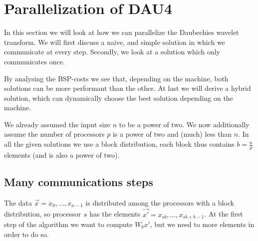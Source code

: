 
\section{Parallelization of DAU4}
\label{sec:par}

In this section we will look at how we can parallelize the Daubechies wavelet transform. We will first discuss a naive, and simple solution in which we communicate at every step. Secondly, we look at a solution which only communicates once.

By analysing the BSP-costs we see that, depending on the machine, both solutions can be more performant than the other. At last we will derive a hybrid solution, which can dynamically choose the best solution depending on the machine.

We already assumed the input size $n$ to be a power of two. We now additionally assume the number of processors $p$ is a power of two and (much) less than $n$. In all the given solutions we use a block distribution, each block thus contains $b = \frac{n}{p}$ elements (and is also a power of two).

\subsection{Many communications steps}
The data $\vec{x} = x_0, \ldots, x_{n-1}$ is distributed among the processors with a block distribution, so processor $s$ has the elements $\vec{x'} = x_{sb}, \ldots, x_{sb+b-1}$. At the first step of the algorithm we want to compute $W_b x'$, but we need to more elements in order to do so.

